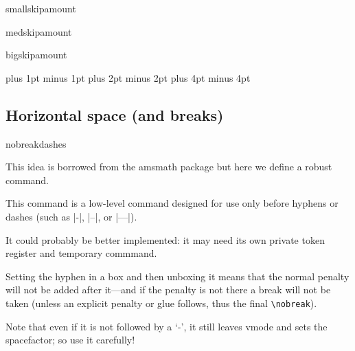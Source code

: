  
 
%    
 \begin{docCommand}{smallskipamount}{}
 \begin{docCommand}{medskipamount}{}
 \begin{docCommand}{bigskipamount}{}
    \begin{teX}
\newskip\smallskipamount \smallskipamount=3pt plus 1pt minus 1pt
\newskip\medskipamount   \medskipamount  =6pt plus 2pt minus 2pt
\newskip\bigskipamount   \bigskipamount =12pt plus 4pt minus 4pt
    \end{teX}
 \end{docCommand}
 \end{docCommand}
 \end{docCommand}
%
%
%
 \subsection{Horizontal space (and breaks)}
%
 \begin{docCommand}{nobreakdashes}{}
 \end{docCommand}
    This idea is borrowed from the \textsf{amsmath} package but
    here we define a robust command.

    This command is a low-level command designed for use only before 
    hyphens or dashes (such as |-|, |--|, or |---|).

    It could probably be better implemented: it may need its own
    private token register and temporary commmand.

    Setting the hyphen in a box and then unboxing it means that the
    normal penalty will not be added after it---and if the penalty is
    not there a break will not be taken (unless an explicit penalty
    or glue follows, thus the final \verb=\nobreak=).

    Note that even if it is not followed by a `-', it still leaves
    vmode and sets the spacefactor; so use it carefully!

    \begin{teX}
\DeclareRobustCommand{\nobreakdashes}{%
  \leavevmode
  \toks@{}%
  \def\reserved@a##1{\toks@\expandafter{\the\toks@-}%
                     \futurelet\@let@token \reserved@b}%
  \def\reserved@b   {\ifx\@let@token -%
                        \expandafter\reserved@a
                     \else
                       \setbox\z@ \hbox{\the\toks@\nobreak}%
                       \unhbox\z@
                       \spacefactor\sfcode`\-
                     \fi}%
  \futurelet\@let@token \reserved@b
}
    \end{teX}
 
